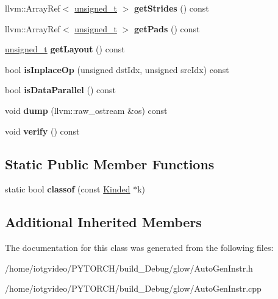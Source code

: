 \begin{DoxyCompactItemize}
llvm\+::\+Array\+Ref$<$ \hyperlink{namespaceglow_a0ca574644e1e42ef193a9947fb4d8911}{unsigned\+\_\+t} $>$ {\bfseries get\+Strides} () const
\item 
\mbox{\label{classglow_1_1_max_pool_with_argmax_inst_a16983af5b36da7c5a4ba1036e459bbfb}} 
llvm\+::\+Array\+Ref$<$ \hyperlink{namespaceglow_a0ca574644e1e42ef193a9947fb4d8911}{unsigned\+\_\+t} $>$ {\bfseries get\+Pads} () const
\item 
\mbox{\label{classglow_1_1_max_pool_with_argmax_inst_a6f0784398dc5d641cc0145a7665f730f}} 
\hyperlink{namespaceglow_a0ca574644e1e42ef193a9947fb4d8911}{unsigned\+\_\+t} {\bfseries get\+Layout} () const
\item 
\mbox{\label{classglow_1_1_max_pool_with_argmax_inst_a53580a413604f9000dd5210322782d5b}} 
bool {\bfseries is\+Inplace\+Op} (unsigned dst\+Idx, unsigned src\+Idx) const
\item 
\mbox{\label{classglow_1_1_max_pool_with_argmax_inst_a5aba307f68dcc3154337eb63ddc5554f}} 
bool {\bfseries is\+Data\+Parallel} () const
\item 
\mbox{\label{classglow_1_1_max_pool_with_argmax_inst_a7a7129c501f1cf0602a6f881d3744644}} 
void {\bfseries dump} (llvm\+::raw\+\_\+ostream \&os) const
\item 
\mbox{\label{classglow_1_1_max_pool_with_argmax_inst_ad9f1596fe0e87a2e8187bfc9c3e5ac37}} 
void {\bfseries verify} () const
\end{DoxyCompactItemize}
\subsection*{Static Public Member Functions}
\begin{DoxyCompactItemize}
\item 
\mbox{\label{classglow_1_1_max_pool_with_argmax_inst_a448e0cd52211192131e418d03ca26e0e}} 
static bool {\bfseries classof} (const \hyperlink{classglow_1_1_kinded}{Kinded} $\ast$k)
\end{DoxyCompactItemize}
\subsection*{Additional Inherited Members}


The documentation for this class was generated from the following files\+:\begin{DoxyCompactItemize}
\item 
/home/iotgvideo/\+P\+Y\+T\+O\+R\+C\+H/build\+\_\+\+Debug/glow/Auto\+Gen\+Instr.\+h\item 
/home/iotgvideo/\+P\+Y\+T\+O\+R\+C\+H/build\+\_\+\+Debug/glow/Auto\+Gen\+Instr.\+cpp\end{DoxyCompactItemize}
